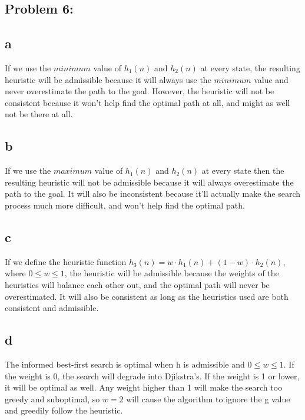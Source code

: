 \documentclass[11pt, oneside]{article}   	%
\begin{document}
\begin{flushleft}
\section*{Problem 6:}
\subsection*{a}
If we use the $minimum$ value of $h_{1}(n)$ and $h_{2}(n)$ at every state, the resulting heuristic will be admissible because it will always use the $minimum$ value and never overestimate the path to the goal. However, the heuristic will not be consistent because it won't help find the optimal path at all, and might as well not be there at all. \\\medskip

\subsection*{b}
If we use the $maximum$ value of $h_{1}(n)$ and $h_{2}(n)$ at every state then the resulting heuristic will not be admissible because it will always overestimate the path to the goal. It will also be inconsistent because it'll actually make the search process much more difficult, and won't help find the optimal path. \\\medskip

\subsection*{c}
If we define the heuristic function $h_{3}(n) = w \cdot h_{1}(n)+(1-w) \cdot h_{2}(n)$, where $0 \leq w \leq 1$, the heuristic will be admissible because the weights of the heuristics will balance each other out, and the optimal path will never be overestimated. It will also be consistent as long as the heuristics used are both consistent and admissible.

\subsection*{d}
The informed best-first search is optimal when h is admissible and $0 \leq w \leq 1$. If the weight is 0, the search will degrade into Djikstra's. If the weight is 1 or lower, it will be optimal as well. Any weight higher than 1 will make the search too greedy and suboptimal, so $w=2$ will cause the algorithm to ignore the g value and greedily follow the heuristic.\\\medskip

\end{flushleft}
\end{document}
